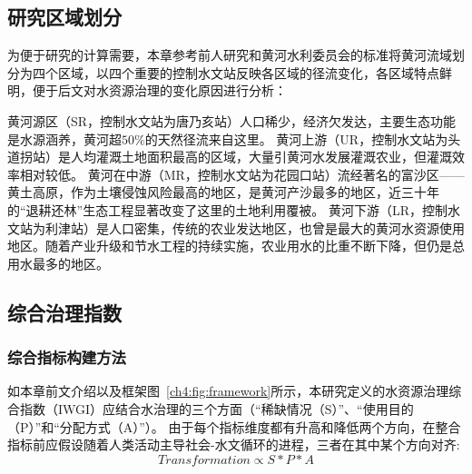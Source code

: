 \subsection{研究区域划分}\label{ch4:sec:region}

为便于研究的计算需要，本章参考前人研究和黄河水利委员会的标准将黄河流域划分为四个区域\cite{shuilibuhuangheshuiliweiyuanhui2010,wang2019f}，以四个重要的控制水文站反映各区域的径流变化，各区域特点鲜明，便于后文对水资源治理的变化原因进行分析：

黄河源区（SR，控制水文站为唐乃亥站）人口稀少，经济欠发达，主要生态功能是水源涵养，黄河超$50\%$的天然径流来自这里。
黄河上游（UR，控制水文站为头道拐站）是人均灌溉土地面积最高的区域，大量引黄河水发展灌溉农业，但灌溉效率相对较低。
黄河在中游（MR，控制水文站为花园口站）流经著名的富沙区——黄土高原，作为土壤侵蚀风险最高的地区，是黄河产沙最多的地区，近三十年的``退耕还林''生态工程显著改变了这里的土地利用覆被。
黄河下游（LR，控制水文站为利津站）是人口密集，传统的农业发达地区，也曾是最大的黄河水资源使用地区。随着产业升级和节水工程的持续实施，农业用水的比重不断下降，但仍是总用水最多的地区。



\subsection{综合治理指数}

\subsubsection{综合指标构建方法}

如本章前文介绍以及框架图~\ref{ch4:fig:framework}所示，本研究定义的水资源治理综合指数（IWGI）应结合水治理的三个方面（``稀缺情况（S）''、``使用目的（P）''和``分配方式（A）''）。
由于每个指标维度都有升高和降低两个方向，在整合指标前应假设随着人类活动主导社会-水文循环的进程，三者在其中某个方向对齐:
\begin{equation}
    Transformation \propto S*P*A
\end{equation}

